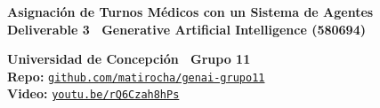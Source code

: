 \documentclass[9pt,a4paper]{extarticle}
\begin{document}
\fontsize{7.2}{8.2}\selectfont

\begin{tcolorbox}[colback=boxbg,colframe=boxframe,arc=1.5mm,boxrule=0.8pt,top=1.5pt,bottom=1.1pt,left=6pt,right=6pt]
\begin{minipage}[c]{0.62\textwidth}
    {\fontsize{11}{12.5}\selectfont \textbf{Asignación de Turnos Médicos con un Sistema de Agentes}}\\[1pt]
    {\fontsize{8}{9}\selectfont \textbf{Deliverable 3 \textbar\ Generative Artificial Intelligence (580694)}}
\end{minipage}\hfill
\begin{minipage}[c]{0.37\textwidth}\raggedleft
    {\fontsize{7.6}{8.8}\selectfont \textbf{Universidad de Concepción \textbar\ Grupo 11}}\\
    {\fontsize{6.6}{7.8}\selectfont \textbf{Repo:} \href{https://github.com/matirocha/genai-grupo11}{\texttt{github.com/matirocha/genai-grupo11}}}\\
    {\fontsize{6.6}{7.8}\selectfont \textbf{Video:} \href{https://youtu.be/rQ6Czah8hPs}{\texttt{youtu.be/rQ6Czah8hPs}}}
\end{minipage}
\end{tcolorbox}
\end{document}

